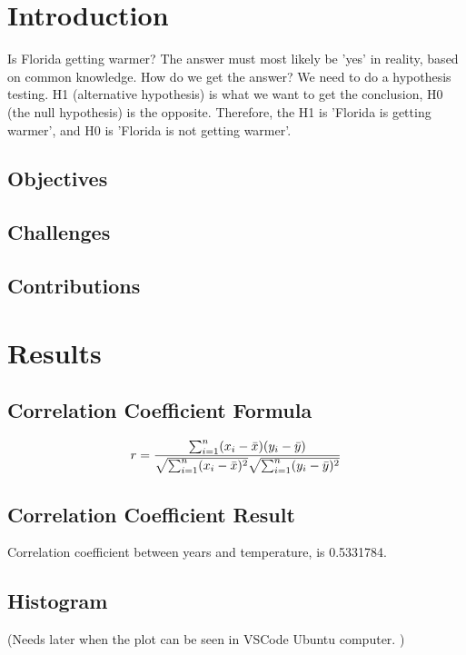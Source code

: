 \chapter{Introduction}

Is Florida getting warmer? The answer must most likely be 'yes' in reality, based on common knowledge. How do we get the answer? We need to do a hypothesis testing. H1 (alternative hypothesis) is what we want to get the conclusion, H0 (the null hypothesis) is the opposite. Therefore, the H1 is 'Florida is getting warmer', and H0 is 'Florida is not getting warmer'. 


\cite{greenwade93}

\section{Objectives}


\section{Challenges}

\section{Contributions}



\chapter{Results}

\section{Correlation Coefficient  Formula}

    \begin{equation} 
        r = \frac{ \sum_{i=1}^{n}(x_i-\bar{x})(y_i-\bar{y}) }{%
        \sqrt{\sum_{i=1}^{n}(x_i-\bar{x})^2}\sqrt{\sum_{i=1}^{n}(y_i-\bar{y})^2}}
    \end{equation}

\section{Correlation Coefficient Result}

Correlation coefficient between years and temperature, is 0.5331784. 

\section{Histogram}
(Needs later when the plot can be seen in VSCode Ubuntu computer. )

